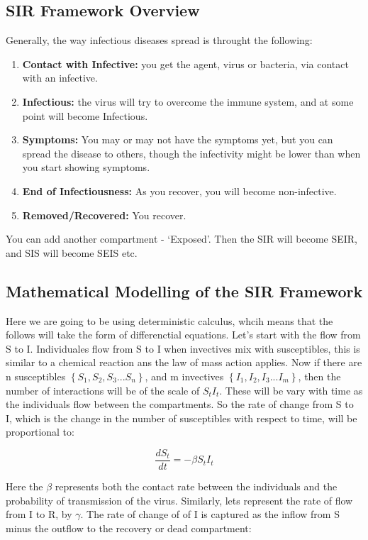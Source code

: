 \documentclass[fontsize=17pt]{article}
\begin{document}
\subsection{SIR Framework Overview}

Generally, the way infectious diseases spread is throught the following:
\begin{enumerate}
	\item \textbf{Contact with Infective: }you get the agent, virus or bacteria, via contact with an infective. 
	\item \textbf{Infectious: }the virus will try to overcome the immune system, and at some point will become Infectious. 
	\item \textbf{Symptoms: }You may or may not have the symptoms yet, but you can spread the disease to others, though the infectivity might be lower than when you start showing symptoms.
	\item \textbf{End of Infectiousness: }As you recover, you will become non-infective.
	\item \textbf{Removed/Recovered: }You recover.
\end{enumerate}
You can add another compartment - `Exposed'. Then the SIR will become SEIR, and SIS will become SEIS etc.

\subsection{Mathematical Modelling of the SIR Framework}

Here we are going to be using deterministic calculus, whcih means that the follows will take the form of differenctial equations. Let's start with the flow from S to I. Individuales flow from S to I when invectives mix with susceptibles, this is similar to a chemical reaction ans the law of mass action applies. Now if there are n susceptibles $\left\lbrace S_{1}, S_{2}, S_{3}... S_{n} \right\rbrace$, and m invectives $\left\lbrace I_{1}, I_{2}, I_{3}... I_{m} \right\rbrace$, then the number of interactions will be of the scale of $S_{t}I_{t}$. These will be vary with time as the individuals flow between the compartments. So the rate of change from S to I, which is the change in the number of susceptibles with respect to time, will be proportional to:

\begin{equation}
	\frac{dS_{t}}{dt}=-\beta S_{t}I_{t}
\end{equation}

Here the $\beta$ represents both the contact rate between the individuals and the probability of transmission of the virus. Similarly, lets represent the rate of flow from I to R, by $\gamma$. The rate of change of of I is captured as the inflow from S minus the outflow to the recovery or dead compartment:
\end{document}
